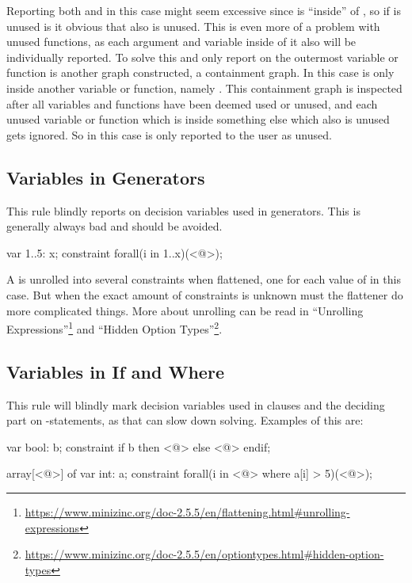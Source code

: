 \documentclass[a4paper,12pt]{article}
\newcommand{\mi}[1]{\mbox{\mzninline{#1}}}
\begin{document}
Reporting both \mi{J} and \mi{M} in this case might seem excessive since \mi{J} is
``inside'' of \mi{M}, so if \mi{M} is unused is it obvious that \mi{J} also is unused.
This is even more of a problem with unused functions, as each argument and variable inside
of it also will be individually reported. To solve this and only report on the outermost
variable or function is another graph constructed, a containment graph. In this case is
only \mi{J} inside another variable or function, namely \mi{M}. This containment graph is
inspected after all variables and functions have been deemed used or unused, and each
unused variable or function which is inside something else which also is unused gets
ignored. So in this case is only \mi{M} reported to the user as unused.

\subsection{Variables in Generators}\label{sec:rule:vargen}
This rule blindly reports on decision variables used in generators. This is generally
always bad and should be avoided.

\begin{mznnobreak}
var 1..5: x;
constraint forall(i in 1..x)(<@\dots@>);
\end{mznnobreak}

A \mi{forall} is unrolled into several constraints when flattened, one for each
value of \mi{i} in this case. But when the exact amount of constraints is unknown must the
flattener do more complicated things. More about unrolling can be read in ``Unrolling
Expressions''\footnote{\url{https://www.minizinc.org/doc-2.5.5/en/flattening.html\#unrolling-expressions}}
and ``Hidden Option Types''\footnote{\url{https://www.minizinc.org/doc-2.5.5/en/optiontypes.html\#hidden-option-types}}.

\subsection{Variables in If and Where}\label{sec:rule:varif}
This rule will blindly mark decision variables used in \mi{where} clauses and the deciding
part on \mi{if}-statements, as that can slow down solving. Examples of this are:

\begin{mznnobreak}
var bool: b;
constraint if b then <@\dots@> else <@\dots@> endif;
\end{mznnobreak}
\begin{mznnobreak}
array[<@\dots@>] of var int: a;
constraint forall(i in <@\dots@> where a[i] > 5)(<@\dots@>);
\end{mznnobreak}
\end{document}
